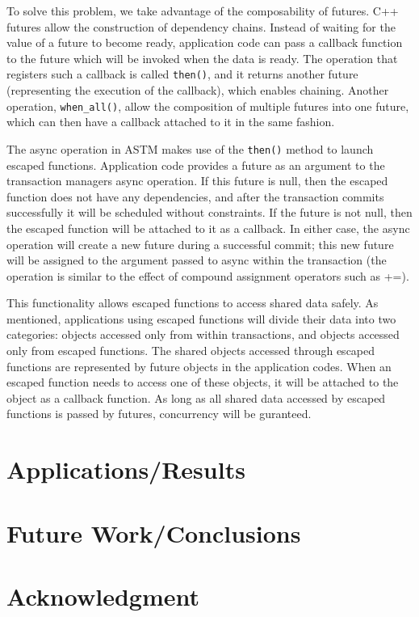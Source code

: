 \documentclass[conference]{IEEEtran}
\begin{document}
To solve this problem, we take advantage of the composability of futures. C++ futures allow the construction of dependency chains. Instead of waiting for the value of a future to become ready, application code can pass a callback function to the future which will be invoked when the data is ready. The operation that registers such a callback is called \lstinline$then()$, and it returns another future (representing the execution of the callback), which enables chaining. Another operation, \lstinline$when_all()$, allow the composition of multiple futures into one future, which can then have a callback attached to it in the same fashion.

The async operation in ASTM makes use of the \lstinline$then()$ method to launch escaped functions. Application code provides a future as an argument to the transaction managers async operation. If this future is null, then the escaped function does not have any dependencies, and after the transaction commits successfully it will be scheduled without constraints. If the future is not null, then the escaped function will be attached to it as a callback. In either case, the async operation will create a new future during a successful commit; this new future will be assigned to the argument passed to async within the transaction (the operation is similar to the effect of compound assignment operators such as +=).

This functionality allows escaped functions to access shared data safely. As mentioned, applications using escaped functions will divide their data into two categories: objects accessed only from within transactions, and objects accessed only from escaped functions. The shared objects accessed through escaped functions are represented by future objects in the application codes. When an escaped function needs to access one of these objects, it will be attached to the object as a callback function. As long as all shared data accessed by escaped functions is passed by futures, concurrency will be guranteed.

\section{Applications/Results}

\section{Future Work/Conclusions}

\section*{Acknowledgment}

%
%

\end{document}
